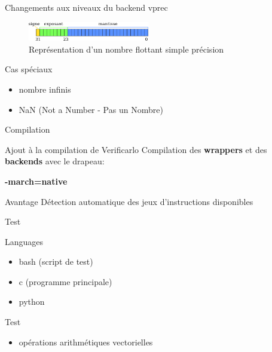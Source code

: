\documentclass{beamer}
\begin{document}
\begin{frame}{Changements aux niveaux du backend vprec}

  \begin{figure}
    \centering
    \includegraphics[width=200px]{../ressources/IEEE754_simple_precision.png}
    \caption{\label{fig:ieee_simple_precision}Représentation d'un nombre flottant simple précision}
  \end{figure}

  \begin{block}{Cas spéciaux}
    \begin{itemize}
    \item nombre infinis
    \item NaN (Not a Number - Pas un Nombre)
    \end{itemize}
  \end{block}

\end{frame}

\begin{frame}{Compilation}

  \begin{block}{Ajout à la compilation de Verificarlo}
    Compilation des \textbf{wrappers} et des \textbf{backends} avec le drapeau:
    \begin{center}
      \textbf{-march=native}
    \end{center}
  \end{block}

  \begin{block}{Avantage}
    Détection automatique des jeux d'instructions disponibles
  \end{block}


\end{frame}

\begin{frame}{Test}

  \begin{block}{Languages}
    \begin{itemize}
    \item bash (script de test)
    \item c (programme principale)
    \item python
    \end{itemize}
  \end{block}

  \begin{block}{Test}
    \begin{itemize}
    \item opérations arithmétiques vectorielles
    \end{itemize}
  \end{block}

\end{frame}
\end{document}
